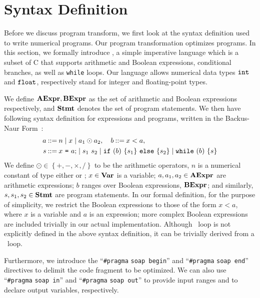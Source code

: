 \section{Syntax Definition}
\label{po:sec:syntax_definition}

Before we discuss program transform, we first look at the syntax definition
used to write numerical programs.  Our program transformation optimizes
\numimp{} programs.  In this section, we formally introduce \numimp, a simple
imperative language which is a subset of C that supports arithmetic and Boolean
expressions, conditional branches, as well as \texttt{while} loops.  Our
language allows numerical data types $\texttt{int}$ and $\texttt{float}$, respectively
stand for integer and floating-point types.

We define $\mathbf{AExpr}, \mathbf{BExpr}$ as the set of arithmetic and Boolean
expressions respectively, and $\mathbf{Stmt}$ denotes the set of program statements.
We then have following syntax definition for expressions and \numimp{}
programs, written in the Backus-Naur Form~\cite{knuth64}:
\newcommand{\syndef}{\ensuremath\mathbin{::=}}%
\newcommand{\synor}{\ensuremath\mid}%
\begin{equation}
    \begin{aligned}
        a \syndef {} &
            n \synor
            x \synor
            a_1 \odot a_2,
        \quad b \syndef x < a, \\
        s \syndef {} &
            x~\texttt{=}~a \semicolon \synor
            s_1~s_2 \synor
            \iflit~(b)~\{ s_1 \}~\elselit~\{ s_2 \} \synor
            \whilelit~(b)~\{s\}
    \end{aligned}
    \label{po:eq:program_syntax}
\end{equation}
We define $\odot \in \left\{ +, -, \times, / \right\}$ to be the arithmetic
operators, $n$ is a numerical constant of type either \inttype{} or \floattype;
$x \in \mathbf{Var}$ is a variable; $a, a_1, a_2 \in \mathbf{AExpr}$ are arithmetic
expressions; $b$ ranges over Boolean expressions, $\mathbf{BExpr}$; and similarly,
$s, s_1, s_2 \in \mathbf{Stmt}$ are program statements.  In our formal definition,
for the purpose of simplicity, we restrict the Boolean expressions to those
of the form $x < a$, where $x$ is a variable and $a$ is an expression;
more complex Boolean expressions are included trivially in our actual
implementation.  Although \forlit~loop is not explicitly defined in the above
syntax definition, it can be trivially derived from a \whilelit~loop.

Furthermore, we introduce the ``\verb|#pragma| \verb|soap begin|'' and
``\verb|#pragma| \verb|soap end|'' directives to delimit the code fragment
to be optimized.  We can also use ``\verb|#pragma| \verb|soap in|'' and
``\verb|#pragma| \verb|soap out|'' to provide input ranges and to declare
output variables, respectively.

